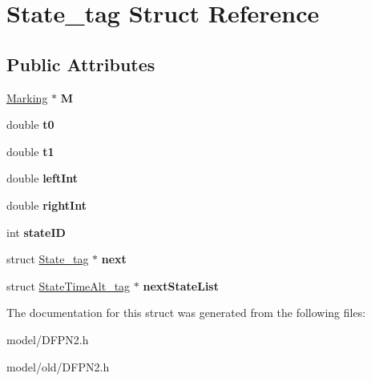 \hypertarget{structState__tag}{\section{State\-\_\-tag Struct Reference}
\label{structState__tag}
}
\subsection*{Public Attributes}
\begin{DoxyCompactItemize}
\item 
\hypertarget{structState__tag_acc55b277afea86edb39e342931d55dde}{\hyperlink{structMarking}{Marking} $\ast$ {\bfseries M}}\label{structState__tag_acc55b277afea86edb39e342931d55dde}

\item 
\hypertarget{structState__tag_a84d04fbe9a860b99508c3562196dd2f7}{double {\bfseries t0}}\label{structState__tag_a84d04fbe9a860b99508c3562196dd2f7}

\item 
\hypertarget{structState__tag_a11d4f5efa54a1519a0c776cb13fa00f6}{double {\bfseries t1}}\label{structState__tag_a11d4f5efa54a1519a0c776cb13fa00f6}

\item 
\hypertarget{structState__tag_aa2a39da2fb489f889c232fd80a9086b2}{double {\bfseries left\-Int}}\label{structState__tag_aa2a39da2fb489f889c232fd80a9086b2}

\item 
\hypertarget{structState__tag_a3a445d4bcb2c518a6122084f6c114e3e}{double {\bfseries right\-Int}}\label{structState__tag_a3a445d4bcb2c518a6122084f6c114e3e}

\item 
\hypertarget{structState__tag_a784999f0cd357dd7b4c49047465346f7}{int {\bfseries state\-I\-D}}\label{structState__tag_a784999f0cd357dd7b4c49047465346f7}

\item 
\hypertarget{structState__tag_a57478cd95be2c5f4086af0f2e3a3ddfb}{struct \hyperlink{structState__tag}{State\-\_\-tag} $\ast$ {\bfseries next}}\label{structState__tag_a57478cd95be2c5f4086af0f2e3a3ddfb}

\item 
\hypertarget{structState__tag_a5fae5fbcede2d6499d720a76d3f30edd}{struct \hyperlink{structStateTimeAlt__tag}{State\-Time\-Alt\-\_\-tag} $\ast$ {\bfseries next\-State\-List}}\label{structState__tag_a5fae5fbcede2d6499d720a76d3f30edd}

\end{DoxyCompactItemize}


The documentation for this struct was generated from the following files\-:\begin{DoxyCompactItemize}
\item 
model/D\-F\-P\-N2.\-h\item 
model/old/D\-F\-P\-N2.\-h\end{DoxyCompactItemize}
